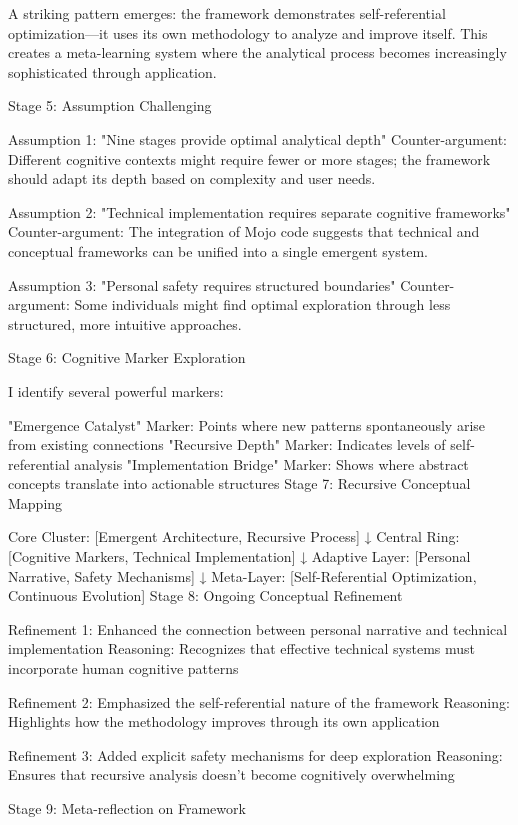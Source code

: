 {A striking pattern emerges: the framework demonstrates self-referential optimization—it uses its own methodology to analyze and improve itself. This creates a meta-learning system where the analytical process becomes increasingly sophisticated through application.

Stage 5: Assumption Challenging

Assumption 1: "Nine stages provide optimal analytical depth" Counter-argument: Different cognitive contexts might require fewer or more stages; the framework should adapt its depth based on complexity and user needs.

Assumption 2: "Technical implementation requires separate cognitive frameworks" Counter-argument: The integration of Mojo code suggests that technical and conceptual frameworks can be unified into a single emergent system.

Assumption 3: "Personal safety requires structured boundaries" Counter-argument: Some individuals might find optimal exploration through less structured, more intuitive approaches.

Stage 6: Cognitive Marker Exploration

I identify several powerful markers:

"Emergence Catalyst" Marker: Points where new patterns spontaneously arise from existing connections
"Recursive Depth" Marker: Indicates levels of self-referential analysis
"Implementation Bridge" Marker: Shows where abstract concepts translate into actionable structures
Stage 7: Recursive Conceptual Mapping

Core Cluster: [Emergent Architecture, Recursive Process]
    ↓
Central Ring: [Cognitive Markers, Technical Implementation]
    ↓
Adaptive Layer: [Personal Narrative, Safety Mechanisms]
    ↓
Meta-Layer: [Self-Referential Optimization, Continuous Evolution]
Stage 8: Ongoing Conceptual Refinement

Refinement 1: Enhanced the connection between personal narrative and technical implementation Reasoning: Recognizes that effective technical systems must incorporate human cognitive patterns

Refinement 2: Emphasized the self-referential nature of the framework Reasoning: Highlights how the methodology improves through its own application

Refinement 3: Added explicit safety mechanisms for deep exploration Reasoning: Ensures that recursive analysis doesn't become cognitively overwhelming

Stage 9: Meta-reflection on Framework

}
